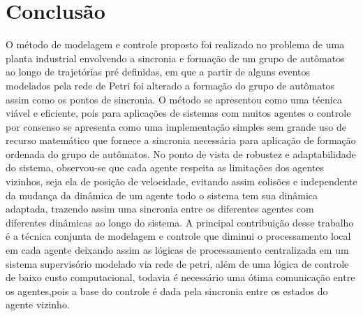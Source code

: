 \chapter{Conclusão}

O método de modelagem e controle proposto foi realizado no problema de uma planta industrial envolvendo a sincronia e formação de um grupo de autômatos ao longo de trajetórias pré definidas, em que a partir de alguns eventos modelados pela rede de Petri foi alterado a formação do grupo de autômatos assim como os pontos de sincronia.
O método se apresentou como uma técnica viável e eficiente, pois para aplicações de sistemas com muitos agentes o controle por consenso se apresenta como uma implementação simples sem grande uso de recurso matemático que fornece a sincronia necessária para aplicação de formação ordenada do grupo de autômatos.
No ponto de vista de robustez e adaptabilidade do sistema, observou-se que cada agente respeita as limitações dos agentes vizinhos, seja ela de posição de velocidade, evitando assim colisões e independente da mudança da dinâmica de um agente todo o sistema tem sua dinâmica adaptada, trazendo assim uma sincronia entre os diferentes agentes com diferentes dinâmicas ao longo do sistema.
A principal contribuição desse trabalho é a técnica conjunta de modelagem e controle que  diminui o processamento local em cada agente deixando assim as lógicas de processamento centralizada em um sistema supervisório modelado via rede de petri, além de uma lógica de controle de baixo custo computacional, todavia é necessário uma ótima comunicação entre os agentes,pois a base do controle é dada pela sincronia entre os estados do agente vizinho.
